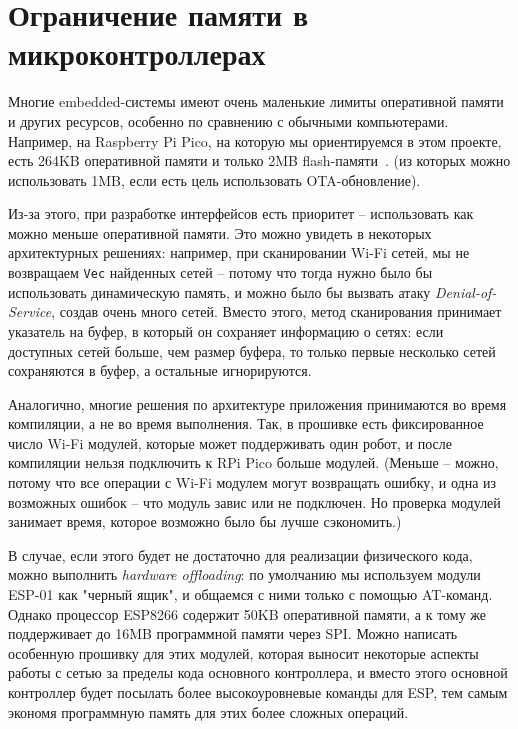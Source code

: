\documentclass[%
]{report}
\begin{document}
\section{Ограничение памяти в микроконтроллерах}

Многие embedded-системы имеют очень маленькие лимиты оперативной
памяти и других ресурсов, особенно по сравнению с обычными компьютерами.
Например, на Raspberry Pi Pico, 
на которую мы ориентируемся в этом проекте,
есть 264KB оперативной памяти
и только 2MB flash-памяти~\cite{raspberrypi2021}.
(из которых можно использовать 1MB, если есть цель использовать OTA-обновление).

Из-за этого, при разработке интерфейсов есть приоритет --
использовать как можно меньше оперативной памяти.
Это можно увидеть в некоторых архитектурных решениях:
например, при сканировании Wi-Fi сетей,
мы не возвращаем \texttt{Vec} найденных сетей -- 
потому что тогда нужно было бы использовать динамическую память,
и можно было бы вызвать атаку \emph{Denial-of-Service},
создав очень много сетей.
Вместо этого, метод сканирования принимает указатель на буфер,
в который он сохраняет информацию о сетях:
если доступных сетей больше, чем размер буфера,
то только первые несколько сетей сохраняются в буфер,
а остальные игнорируются.

Аналогично, многие решения по архитектуре приложения
принимаются во время компиляции, а не во время выполнения.
Так, в прошивке есть фиксированное число Wi-Fi модулей,
которые может поддерживать один робот,
и после компиляции нельзя подключить к RPi Pico больше модулей.
(Меньше -- можно, потому что все операции с Wi-Fi модулем могут возвращать ошибку,
и одна из возможных ошибок -- что модуль завис или не подключен. Но проверка модулей
занимает время, которое возможно было бы лучше сэкономить.)

В случае, если этого будет не достаточно для реализации физического кода,
можно выполнить \emph{hardware offloading}:
по умолчанию мы используем модули ESP-01 как "черный ящик",
и общаемся с ними только с помощью AT-команд.
Однако процессор ESP8266 содержит 50KB оперативной памяти,
а к тому же поддерживает до 16MB программной памяти через SPI.
Можно написать особенную прошивку для этих модулей,
которая выносит некоторые аспекты работы с сетью
за пределы кода основного контроллера,
и вместо этого основной контроллер будет посылать более высокоуровневые
команды для ESP,
тем самым экономя программную память для этих более сложных операций.
\end{document}

